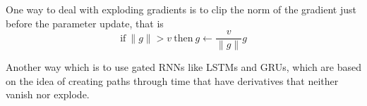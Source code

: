 \documentclass{article}
\begin{document}
One way to deal with exploding gradients is to clip the norm of the gradient just before the parameter update, that is 
\[\text{if}\ \lVert g \rVert > v\ \text{then}\ g \gets \frac{v}{\lVert g \rVert} g\]

Another way which is to use gated RNNs like LSTMs and GRUs, which are based on the idea of creating paths through time that have derivatives that neither vanish nor explode.



\end{document}
